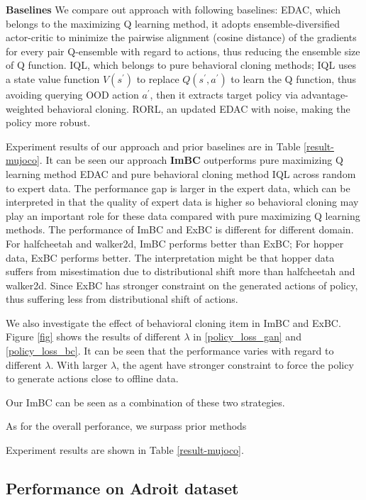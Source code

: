\documentclass[nohyperref]{article}
\theoremstyle{plain}
\theoremstyle{definition}
\theoremstyle{remark}
\begin{document}
\textbf{Baselines} We compare out approach with following baselines: EDAC\cite{edac}, which belongs to the maximizing Q learning method, it adopts ensemble-diversified actor-critic to minimize the pairwise alignment (cosine distance) of the gradients for every pair Q-ensemble with regard to actions, thus reducing the ensemble size of Q function. 
IQL\cite{iql}, which belongs to pure behavioral cloning methods; IQL uses a state value function $V(s^{\prime})$ to replace $Q(s^{\prime},a^{\prime})$ to learn the Q function, thus avoiding querying OOD action $a^{\prime}$, then it extracts target policy via advantage-weighted behavioral cloning.
RORL\cite{rorl}, an updated EDAC with noise, making the policy more robust.

Experiment results of our approach and prior baselines are in Table \ref{result-mujoco}. It can be seen our approach \textbf{ImBC} outperforms pure maximizing Q learning method EDAC and pure behavioral cloning method IQL across random to expert data. The performance gap is larger in the expert data, which can be interpreted in that the quality of expert data is higher so behavioral cloning may play an important role for these data compared with pure maximizing Q learning methods. The performance of ImBC and ExBC is different for different domain. For halfcheetah and walker2d, ImBC performs better than ExBC; For hopper data, ExBC performs better. The interpretation might be that hopper data suffers from misestimation due to distributional shift more than halfcheetah and walker2d. Since ExBC has stronger constraint on the generated actions of policy, thus suffering less from distributional shift of actions.

We also investigate the effect of behavioral cloning item in ImBC and ExBC. Figure \ref{fig} shows the results of different $\lambda$ in \eqref{policy_loss_gan} and \eqref{policy_loss_bc}. It can be seen that the performance varies with regard to different $\lambda$. With larger $\lambda$, the agent have stronger constraint to force the policy to generate actions close to offline data. 

Our ImBC can be seen as a combination of these two strategies. 

As for the overall perforance, we surpass prior methods

Experiment results are shown in Table \ref{result-mujoco}. 


\subsection{Performance on Adroit dataset}
\end{document}
